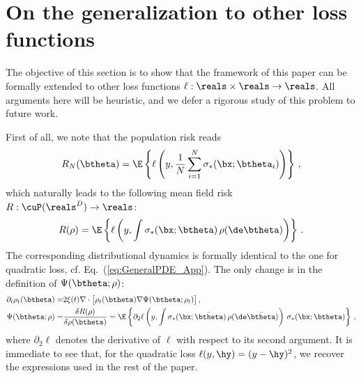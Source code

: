 \documentclass[11pt]{article}
\begin{document}
\section{On the generalization to other loss functions}

The objective of this section is to show that the framework of this paper can be formally extended to other loss functions $\ell:\reals\times \reals\to\reals$. 
All arguments here will be heuristic, and we defer a rigorous study of this problem to future work.

First of all, we note that the population risk reads
%
\begin{align}
%
R_N(\btheta) = \E\left\{\ell\left(y,\frac{1}{N}\sum_{i=1}^N\sigma_*(\bx;\btheta_i)\right)\right\}\, ,
%
\end{align}
%
which naturally leads to the following mean field risk $R:\cuP(\reals^D)\to  \reals$:
%
\begin{align}
%
R(\rho) = \E\left\{\ell\left(y,\int\sigma_*(\bx;\btheta)\, \rho(\de\btheta)\right)\right\}\, .
%
\end{align}
%
The corresponding distributional dynamics is formally identical to the one for quadratic loss, cf. Eq.~(\ref{eq:GeneralPDE_App}).
The only change is in the definition of $\Psi(\btheta;\rho)$:
%
\begin{align}
%
\partial_t\rho_t(\btheta) =& 2 \xi(t) \nabla\cdot \big[\rho_t(\btheta)\nabla\Psi(\btheta;\rho_t)\big]\,, \label{eq:GeneralPDE_GenLoss}\\
\Psi(\btheta; \rho) =& \frac{\delta R(\rho)}{\delta\rho(\btheta)} =  \E\left\{\partial_2\ell\left(y,\int\sigma_*(\bx;\bar{\btheta})\, \rho(\de\bar{\btheta})\right) \, \sigma_*(\bx;\btheta)\right\} \,,
%
\end{align}
%
where $\partial_2\ell$ denotes the derivative of $\ell$ with respect to its second argument.
It is immediate to see that, for the quadratic loss $\ell(y,\hy) = (y-\hy)^2$, we recover the expressions used in the rest of the paper.
\end{document}
